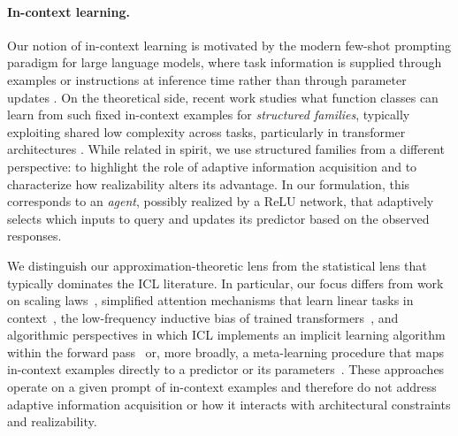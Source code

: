 \documentclass{article}
\begin{document}
\paragraph{In-context learning.}
Our notion of in-context learning is motivated by the modern few-shot prompting paradigm for large
language models, where task information is supplied through examples or instructions at inference time rather than through parameter updates \cite{brown2020}. 
On the theoretical side, recent work studies what 
function classes can learn from such fixed in-context examples for \emph{structured families}, typically exploiting shared low complexity across tasks, particularly in transformer architectures \cite{akyurek2023what, garg2022}. 
While related in spirit, we use structured families from a different perspective: to highlight the role of adaptive information acquisition and to characterize how realizability alters its advantage.
In our formulation, this corresponds to an \emph{agent}, possibly realized by a ReLU network, that adaptively selects which inputs to query and updates its predictor based on the observed responses.

We distinguish our approximation-theoretic lens from the statistical lens that typically dominates the ICL literature. In particular, our focus differs from work on scaling laws~\cite{bordelon2025theory}, simplified attention mechanisms that learn linear tasks in context~\cite{wu2023many,zhang2024trained}, the low-frequency inductive bias of trained transformers~\cite{yang2025provable}, and algorithmic perspectives in which ICL implements an implicit learning algorithm within the forward pass~\cite{vonoswald2023what} or, more broadly, a meta-learning procedure that maps in-context examples directly to a predictor or its parameters~\cite{chen2022transformers}.
These approaches operate on a given prompt of in-context examples and therefore do not address adaptive information acquisition or how it interacts with architectural constraints and realizability.
\end{document}
